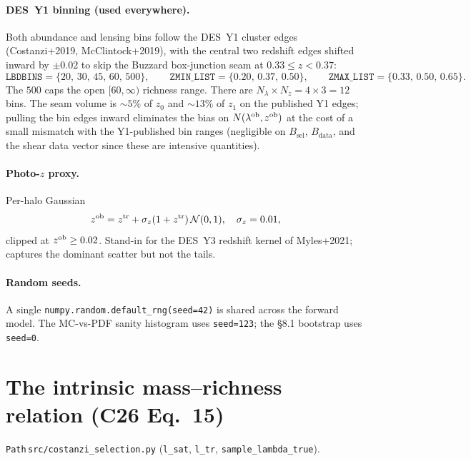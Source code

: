 \documentclass[a4paper, 11pt]{article}
\newcommand{\lob}{\lambda^{\rm ob}}
\newcommand{\zob}{z^{\rm ob}}
\newcommand{\ztr}{z^{\rm tr}}
\newcommand{\modname}[1]{\textcolor{kwcol}{\texttt{#1}}}
\newcommand{\pyfile}[1]{{\small\texttt{#1}}}
\begin{document}
\paragraph{DES~Y1 binning (used everywhere).} Both abundance and lensing
bins follow the DES~Y1 cluster edges (Costanzi+2019, McClintock+2019),
with the central two redshift edges shifted inward by $\pm 0.02$ to
skip the Buzzard box-junction seam at $0.33 \le z < 0.37$:
\begin{equation*}
  \texttt{LBDBINS}    = \{20,\, 30,\, 45,\, 60,\, 500\},\qquad
  \texttt{ZMIN\_LIST} = \{0.20,\, 0.37,\, 0.50\},\qquad
  \texttt{ZMAX\_LIST} = \{0.33,\, 0.50,\, 0.65\}.
\end{equation*}
The $500$ caps the open $[60, \infty)$ richness range. There are
$N_\lambda \times N_z = 4 \times 3 = 12$ bins. The seam volume is
$\sim 5\%$ of $z_0$ and $\sim 13\%$ of $z_1$ on the published Y1
edges; pulling the bin edges inward eliminates the bias on $N(\lob,
\zob)$ at the cost of a small mismatch with the Y1-published bin
ranges (negligible on $B_\mathrm{sel}$, $B_\mathrm{data}$, and the
shear data vector since these are intensive quantities).

\paragraph{Photo-$z$ proxy.} Per-halo Gaussian
\begin{equation}
  \zob = \ztr + \sigma_z(1 + \ztr)\,\mathcal N(0, 1),\quad \sigma_z = 0.01,
  \label{eq:photoz-proxy}
\end{equation}
clipped at $\zob \ge 0.02$. Stand-in for the DES~Y3 redshift kernel of
Myles+2021; captures the dominant scatter but not the tails.

\paragraph{Random seeds.} A single
\texttt{numpy.random.default\_rng(seed=42)} is shared across the forward
model. The MC-vs-PDF sanity histogram uses \texttt{seed=123}; the §8.1
bootstrap uses \texttt{seed=0}.

\section{The intrinsic mass--richness relation (C26 Eq.~15)}
\label{sec:mass-richness}

\modname{Path}\,\pyfile{src/costanzi\_selection.py}
(\texttt{l\_sat}, \texttt{l\_tr}, \texttt{sample\_lambda\_true}).
\end{document}
